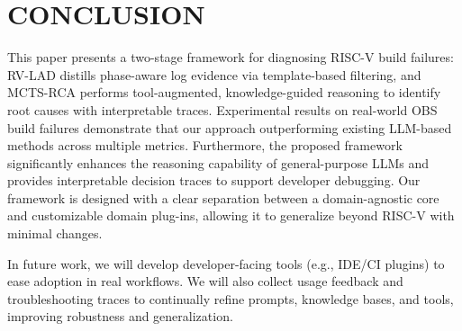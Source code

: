 \documentclass[10pt,conference]{IEEEtran}
\begin{document}
\section{CONCLUSION}
This paper presents a two-stage framework for diagnosing RISC-V build failures: RV-LAD distills phase-aware log evidence via template-based filtering, and MCTS-RCA performs tool-augmented, knowledge-guided reasoning to identify root causes with interpretable traces. 
Experimental results on real-world OBS build failures demonstrate that our approach outperforming existing LLM-based methods across multiple metrics. Furthermore, the proposed framework significantly enhances the reasoning capability of general-purpose LLMs and provides interpretable decision traces to support developer debugging. Our framework is designed with a clear separation between a domain-agnostic core and customizable domain plug-ins, allowing it to generalize beyond RISC-V with minimal changes.

In future work, we will develop developer-facing tools (e.g., IDE/CI plugins) to ease adoption in real workflows. We will also collect  usage feedback and troubleshooting traces to continually refine prompts, knowledge bases, and tools, improving robustness and generalization.


\vspace{12pt}



\end{document}
